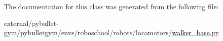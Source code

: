 The documentation for this class was generated from the following file\+:\begin{DoxyCompactItemize}
\item 
external/pybullet-\/gym/pybulletgym/envs/roboschool/robots/locomotors/\hyperlink{roboschool_2robots_2locomotors_2walker__base_8py}{walker\+\_\+base.\+py}\end{DoxyCompactItemize}

